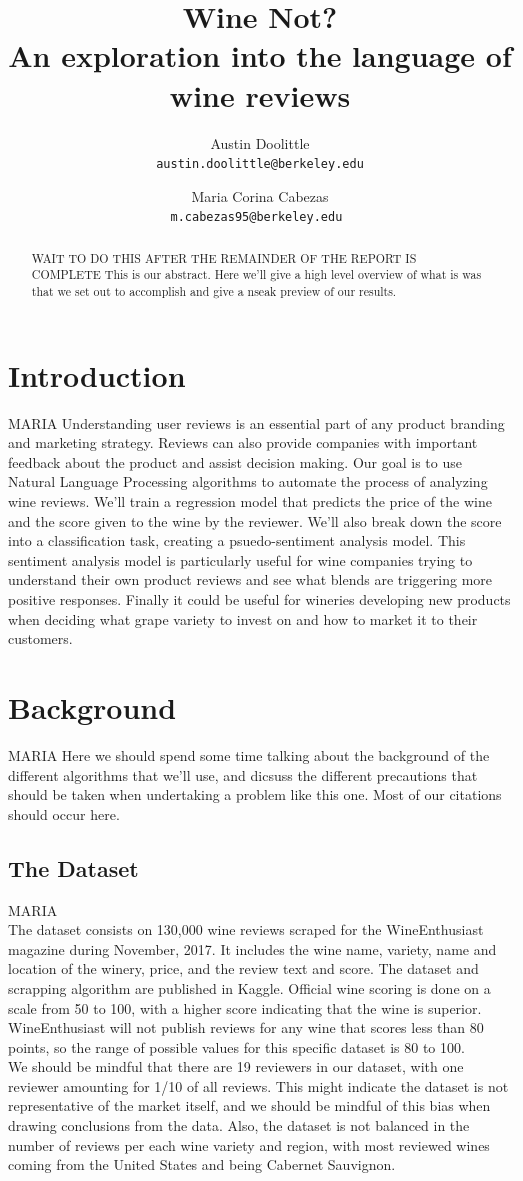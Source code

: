 \documentclass[11pt]{article}
\title{
    Wine Not? \\
    \large An exploration into the language of wine reviews
}
\author{
    Austin Doolittle \\
    \texttt{austin.doolittle@berkeley.edu}
    \and
    Maria Corina Cabezas \\
    \texttt{m.cabezas95@berkeley.edu }
}
\begin{document}
\maketitle
\begin{abstract}
    WAIT TO DO THIS AFTER THE REMAINDER OF THE REPORT IS COMPLETE
    This is our abstract. Here we'll give a high level overview of what is was that we set out to accomplish and give a nseak preview of our results.
\end{abstract}

\section{Introduction}
    MARIA
    Understanding user reviews is an essential part of any product branding and marketing strategy. Reviews can also provide companies with important feedback about the product and assist decision making. Our goal is to use Natural Language Processing algorithms to automate the process of analyzing wine reviews. We'll train a regression model that predicts the price of the wine and the score given to the wine by the reviewer. We'll also break down the score into a classification task, creating a psuedo-sentiment analysis model. This sentiment analysis model is particularly useful for wine companies trying to understand their own product reviews and see what blends are triggering more positive responses. Finally it could be useful for wineries developing new products when deciding what grape variety to invest on and how to market it to their customers. 
\section{Background}
    MARIA
    Here we should spend some time talking about the background of the different algorithms that we'll use, and dicsuss the different precautions that should be taken when undertaking a problem like this one. Most of our citations should occur here.

\subsection{The Dataset}
    MARIA \\
    The dataset consists on 130,000 wine reviews scraped for the WineEnthusiast magazine during November, 2017. It includes the wine name, variety, name and location of the winery, price, and the review text and score. The dataset and scrapping algorithm are published in Kaggle. 
    Official wine scoring is done on a scale from 50 to 100, with a higher score indicating that the wine is superior. WineEnthusiast will not publish reviews for any wine that scores less than 80 points, so the range of possible values for this specific dataset is 80 to 100. \\
    We should be mindful that there are 19 reviewers in our dataset, with one reviewer amounting for 1/10 of all reviews. This might indicate the dataset is not representative of the market itself, and we should be mindful of this bias when drawing conclusions from the data. 
    Also, the dataset is not balanced in the number of reviews per each wine variety and region, with most reviewed wines coming from the United States and being Cabernet Sauvignon.
\end{document}
